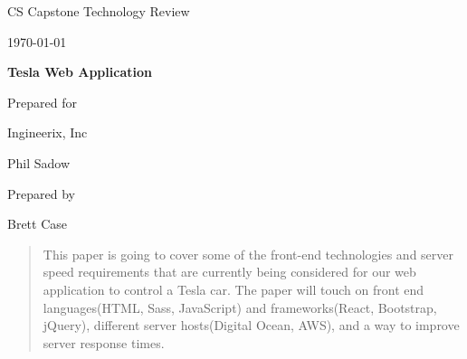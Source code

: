 \documentclass[onecolumn, draftclsnofoot,10pt, compsoc]{IEEEtran}
\def \CapstoneTeamName{                 The Ingineers}
\def \CapstoneTeamNumber{               22}
\def \GroupMemberOne{                   Brett Case}
\def \GroupMemberTwo{                   Alexander Morefield}
\def \GroupMemberThree{                 James Zeng}
\def \GroupMemberFour{                  Christopher Jansen}
\def \GroupMemberFive{                  Burton Jaursch}
\def \CapstoneProjectName{              Tesla Web Application}
\def \CapstoneSponsorCompany{           Ingineerix, Inc}
\def \CapstoneSponsorPerson{            Phil Sadow}
\def \DocType{                  %
                                Technology Review
                                }
\newcommand{\NameSigPair}[1]{\par
\makebox[2.75in][r]{#1} \hfil   \makebox[3.25in]{\makebox[2.25in]{\hrulefill} \hfill            \makebox[.75in]{\hrulefill}}
\par\vspace{-12pt} \textit{\tiny\noindent
\makebox[2.75in]{} \hfil                \makebox[3.25in]{\makebox[2.25in][r]{Signature} \hfill  \makebox[.75in][r]{Date}}}}
\renewcommand{\NameSigPair}[1]{#1}
\begin{document}
\begin{titlepage}
    \begin{singlespace}
        \hfill
        \par\vspace{.2in}
        \centering
        \scshape{
            \huge CS Capstone \DocType \par
            {\large\today}\par
            \vspace{.5in}
            \textbf{\Huge\CapstoneProjectName}\par
            \vfill

            \vfill
            {\large Prepared for}\par
            \Huge \CapstoneSponsorCompany\par
            \vspace{5pt}
            {\Large\NameSigPair{\CapstoneSponsorPerson}\par}
            {\large Prepared by }\par
            \vspace{5pt}
            {\Large
                \NameSigPair{\GroupMemberOne}\par
            }
            \vspace{20pt}
        }
        \begin{abstract}
        This paper is going to cover some of the front-end technologies and server speed requirements that are currently being considered for our web application to control a Tesla car. The paper will touch on front end languages(HTML, Sass, JavaScript) and frameworks(React, Bootstrap, jQuery), different server hosts(Digital Ocean, AWS), and a way to improve server response times.
        \end{abstract}
    \end{singlespace}
\end{titlepage}
\newpage
{}
\tableofcontents
\clearpage
\end{document}
